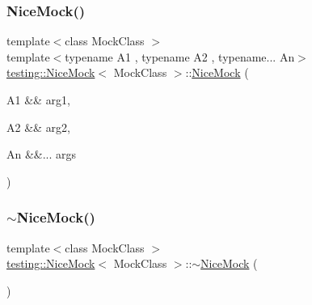 \subsubsection{\texorpdfstring{NiceMock()}{NiceMock()}\hspace{0.1cm}{\footnotesize\ttfamily [3/17]}}
{\footnotesize\ttfamily template$<$class Mock\+Class $>$ \\
template$<$typename A1 , typename A2 , typename... An$>$ \\
\mbox{\hyperlink{classtesting_1_1_nice_mock}{testing\+::\+Nice\+Mock}}$<$ Mock\+Class $>$\+::\mbox{\hyperlink{classtesting_1_1_nice_mock}{Nice\+Mock}} (\begin{DoxyParamCaption}\item[{A1 \&\&}]{arg1,  }\item[{A2 \&\&}]{arg2,  }\item[{An \&\&...}]{args }\end{DoxyParamCaption})\hspace{0.3cm}{\ttfamily [inline]}}

\mbox{\label{classtesting_1_1_nice_mock_a30be5e5e20248f31c8390cd88fa74d7f}} 
\subsubsection{\texorpdfstring{$\sim$NiceMock()}{~NiceMock()}\hspace{0.1cm}{\footnotesize\ttfamily [1/3]}}
{\footnotesize\ttfamily template$<$class Mock\+Class $>$ \\
\mbox{\hyperlink{classtesting_1_1_nice_mock}{testing\+::\+Nice\+Mock}}$<$ Mock\+Class $>$\+::$\sim$\mbox{\hyperlink{classtesting_1_1_nice_mock}{Nice\+Mock}} (\begin{DoxyParamCaption}{ }\end{DoxyParamCaption})\hspace{0.3cm}{\ttfamily [inline]}}

\mbox{\label{classtesting_1_1_nice_mock_a10bbd6ebe779ac8ab1f9f3ae2dee9310}} 
